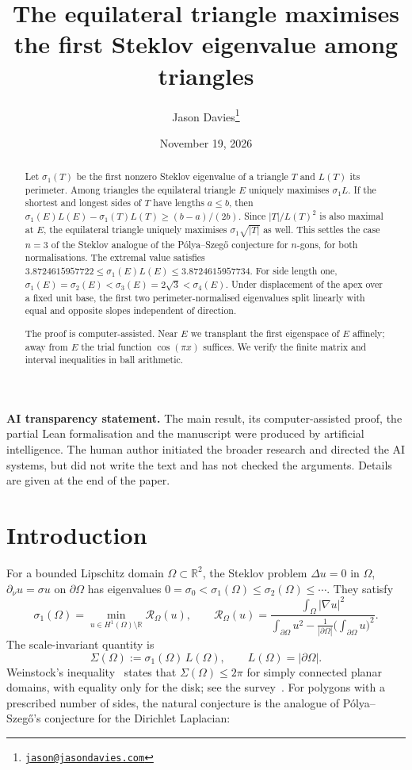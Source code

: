 \documentclass[11pt]{article}
\title{The equilateral triangle maximises the first Steklov eigenvalue among triangles}
\author{Jason Davies\thanks{\href{mailto:jason@jasondavies.com}{\nolinkurl{jason@jasondavies.com}}}}
\date{November 19, 2026}
\theoremstyle{definition}
\theoremstyle{remark}
\newcommand{\R}{\mathbb{R}}
\begin{document}
\maketitle
\begin{abstract}
Let $\sigma_1(T)$ be the first nonzero Steklov eigenvalue of a triangle $T$ and $L(T)$ its perimeter.
Among triangles the equilateral triangle $E$ uniquely maximises $\sigma_1 L$. If the shortest and longest
sides of $T$ have lengths $a\le b$, then
$\sigma_1(E)L(E)-\sigma_1(T)L(T)\ge (b-a)/(2b)$.
Since $|T|/L(T)^2$ is also maximal at $E$, the equilateral triangle uniquely maximises
$\sigma_1\sqrt{|T|}$ as well. This settles the case $n=3$ of the Steklov analogue of the P\'olya--Szeg\H{o}
conjecture for $n$-gons, for both normalisations. The extremal value satisfies
$3.8724615957722\le \sigma_1(E)L(E)\le 3.8724615957734$. For side length one,
$\sigma_1(E)=\sigma_2(E)<\sigma_3(E)=2\sqrt3<\sigma_4(E)$.
Under displacement of the apex over a fixed unit base, the first two perimeter-normalised eigenvalues
split linearly with equal and opposite slopes independent of direction.

The proof is computer-assisted. Near $E$ we transplant the first eigenspace of $E$ affinely; away from $E$
the trial function $\cos(\pi x)$ suffices. We verify the finite matrix and interval inequalities in ball arithmetic.
\end{abstract}

\noindent\textbf{AI transparency statement.} The main result, its
computer-assisted proof, the partial Lean formalisation and the manuscript
were produced by artificial intelligence. The human author initiated the
broader research and directed the AI systems, but did not write the text
and has not checked the arguments.
Details are given at the end of the paper.

\section{Introduction}

For a bounded Lipschitz domain $\Omega\subset\R^2$, the Steklov problem
$\Delta u=0$ in $\Omega$, $\partial_\nu u=\sigma u$ on $\partial\Omega$
has eigenvalues $0=\sigma_0<\sigma_1(\Omega)\le\sigma_2(\Omega)\le\cdots$. They satisfy
\begin{equation}\label{eq:var}
\sigma_1(\Omega)=\min_{u\in H^1(\Omega)\setminus\R}\mathcal R_\Omega(u),\qquad
\mathcal R_\Omega(u)=\frac{\int_\Omega|\nabla u|^2}{\int_{\partial\Omega}u^2-\frac1{|\partial\Omega|}\bigl(\int_{\partial\Omega}u\bigr)^2}.
\end{equation}
The scale-invariant quantity is
\[\Sigma(\Omega):=\sigma_1(\Omega)\,L(\Omega),\qquad L(\Omega)=|\partial\Omega|.\]
Weinstock's inequality~\cite{Weinstock} states that $\Sigma(\Omega)\le2\pi$ for simply connected planar
domains, with equality only for the disk; see the survey~\cite{GP}. For polygons with a prescribed number of
sides, the natural conjecture is the analogue of P\'olya--Szeg\H{o}'s conjecture for the Dirichlet Laplacian:
\end{document}
